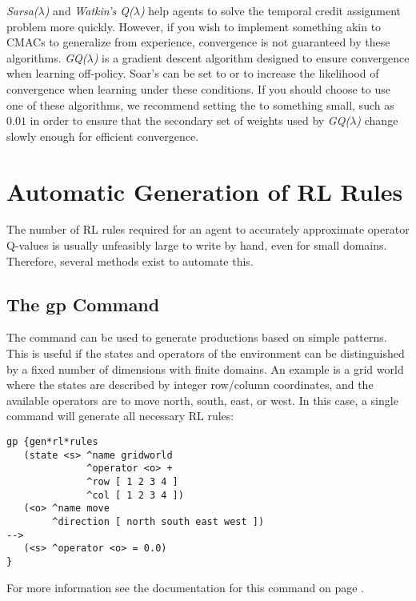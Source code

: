 \emph{Sarsa($\lambda$)} and \emph{Watkin's Q($\lambda$)} help agents to solve the temporal credit assignment problem more quickly.
However, if you wish to implement something akin to CMACs to generalize from experience, convergence is not guaranteed by these algorithms.
\emph{GQ($\lambda$)} is a gradient descent algorithm designed to ensure convergence when learning off-policy.
Soar's  can be set to  or  to increase the likelihood of convergence when learning under these conditions.
If you should choose to use one of these algorithms, we recommend setting the   to something small, such as $0.01$ in order to ensure that the secondary set of weights used by \emph{GQ($\lambda$)} change slowly enough for efficient convergence.

\section{Automatic Generation of RL Rules}

The number of RL rules required for an agent to accurately approximate operator Q-values is usually unfeasibly large to write by hand, even for small domains.
Therefore, several methods exist to automate this.

\subsection{The gp Command}
The  command can be used to generate productions based on simple patterns.
This is useful if the states and operators of the environment can be distinguished by a fixed number of dimensions with finite domains.
An example is a grid world where the states are described by integer row/column coordinates, and the available operators are to move north, south, east, or west.
In this case, a single  command will generate all necessary RL rules:

\begin{verbatim}
gp {gen*rl*rules
   (state <s> ^name gridworld
              ^operator <o> +
              ^row [ 1 2 3 4 ]
              ^col [ 1 2 3 4 ])
   (<o> ^name move
        ^direction [ north south east west ])
-->
   (<s> ^operator <o> = 0.0)
}
\end{verbatim}

For more information see the documentation for this command on page \pageref{gp}.

